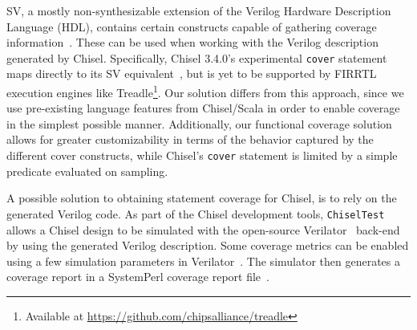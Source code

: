 \documentclass[a4paper]{IEEEtran}
\begin{document}
SV, a mostly non-synthesizable extension of the Verilog Hardware Description Language (HDL), contains certain constructs capable of gathering coverage information~\cite{spear2008systemverilog}. These can be used when working with the Verilog description generated by Chisel. Specifically, Chisel 3.4.0's experimental \texttt{cover} statement maps directly to its SV equivalent~\cite{chisel3.4release_notes}, but is yet to be supported by FIRRTL execution engines like Treadle\footnote{Available at \url{https://github.com/chipsalliance/treadle}}. %
Our solution differs from this approach, since we use pre-existing language features from Chisel/Scala in order to enable coverage in the simplest possible manner. Additionally, our functional coverage solution allows for greater customizability in terms of the behavior captured by the different cover constructs, while Chisel's \texttt{cover} statement is limited by a simple predicate evaluated on sampling.   
  
A possible solution to obtaining statement coverage for Chisel, is to rely on the generated Verilog code. 
As part of the Chisel development tools, \texttt{ChiselTest} allows a Chisel design to be simulated with the open-source Verilator~\cite{verilator} back-end by using the generated Verilog description.
Some coverage metrics can be enabled using a few simulation parameters in Verilator~\cite{tolotto2020}.
The simulator then generates a coverage report in a SystemPerl coverage report file~\cite{SystemPerl}.
\end{document}
